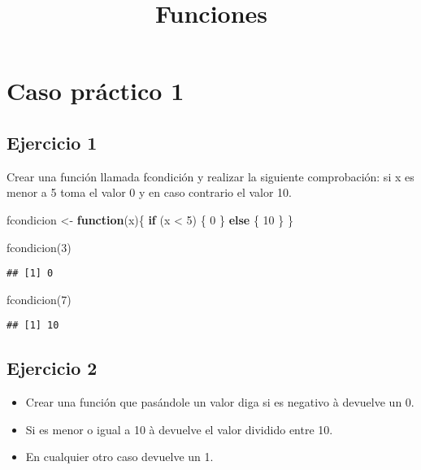\documentclass[
]{article}
\title{Funciones}
\author{}
\date{\vspace{-2.5em}}
\newenvironment{Shaded}{\begin{snugshade}}{\end{snugshade}}
\newcommand{\ControlFlowTok}[1]{\textcolor[rgb]{0.13,0.29,0.53}{\textbf{#1}}}
\newcommand{\DecValTok}[1]{\textcolor[rgb]{0.00,0.00,0.81}{#1}}
\newcommand{\FunctionTok}[1]{\textcolor[rgb]{0.00,0.00,0.00}{#1}}
\newcommand{\NormalTok}[1]{#1}
\newcommand{\OtherTok}[1]{\textcolor[rgb]{0.56,0.35,0.01}{#1}}
\newcommand{\SpecialCharTok}[1]{\textcolor[rgb]{0.00,0.00,0.00}{#1}}
\providecommand{\tightlist}{%
  \setlength{\itemsep}{0pt}\setlength{\parskip}{0pt}}
\begin{document}
\maketitle

\hypertarget{caso-pruxe1ctico-1}{%
\section{Caso práctico 1}\label{caso-pruxe1ctico-1}}

\hypertarget{ejercicio-1}{%
\subsection{Ejercicio 1}\label{ejercicio-1}}

Crear una función llamada fcondición y realizar la siguiente
comprobación: si x es menor a 5 toma el valor 0 y en caso contrario el
valor 10.

\begin{Shaded}
\begin{Highlighting}[]
\NormalTok{fcondicion }\OtherTok{\textless{}{-}} \ControlFlowTok{function}\NormalTok{(x)\{}
  \ControlFlowTok{if}\NormalTok{ (x }\SpecialCharTok{\textless{}} \DecValTok{5}\NormalTok{) \{}
    \DecValTok{0}
\NormalTok{  \} }\ControlFlowTok{else}\NormalTok{ \{}
    \DecValTok{10}
\NormalTok{  \}}
\NormalTok{\}}

\FunctionTok{fcondicion}\NormalTok{(}\DecValTok{3}\NormalTok{)}
\end{Highlighting}
\end{Shaded}

\begin{verbatim}
## [1] 0
\end{verbatim}

\begin{Shaded}
\begin{Highlighting}[]
\FunctionTok{fcondicion}\NormalTok{(}\DecValTok{7}\NormalTok{)}
\end{Highlighting}
\end{Shaded}

\begin{verbatim}
## [1] 10
\end{verbatim}

\hypertarget{ejercicio-2}{%
\subsection{Ejercicio 2}\label{ejercicio-2}}

\begin{itemize}
\tightlist
\item
  Crear una función que pasándole un valor diga si es negativo à
  devuelve un 0.
\item
  Si es menor o igual a 10 à devuelve el valor dividido entre 10.
\item
  En cualquier otro caso devuelve un 1.
\end{itemize}
\end{document}
